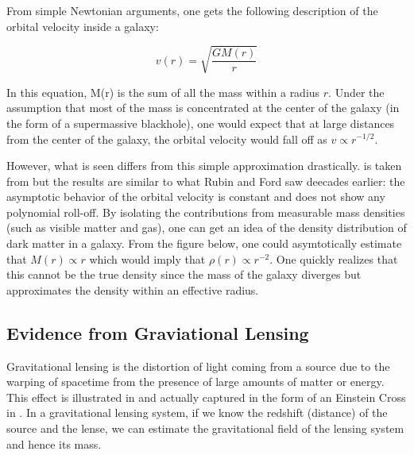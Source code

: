 	From simple Newtonian arguments, one gets the following description of the orbital velocity inside a galaxy:
	
\begin{equation}
v(r) = \sqrt{\frac{G M(r)}{r}}
\end{equation}	

In this equation, M(r) is the sum of all the mass within a radius $r$.  Under the assumption that most of the mass is concentrated at the center of the galaxy (in the form of a supermassive blackhole), one would expect that at large distances from the center of the galaxy, the orbital velocity would fall off as $v \propto r^{-1/2}$.

However, what is seen differs from this simple approximation drastically.   is taken from  but the results are similar to what Rubin and Ford saw deecades earlier: the asymptotic behavior of the orbital velocity is constant and does not show any polynomial roll-off.  By isolating the contributions from measurable mass densities (such as visible matter and gas), one can get an idea of the density distribution of dark matter in a galaxy.  From the figure below, one could asymtotically estimate that $M(r) \propto r$ which would imply that $\rho(r) \propto r^{-2}$.  One quickly realizes that this cannot be the true density since the mass of the galaxy diverges but approximates the density within an effective radius.



\subsection{Evidence from Graviational Lensing}	

Gravitational lensing is the distortion of light coming from a source due to the warping of spacetime from the presence of large amounts of matter or energy.  This effect is illustrated in  and actually captured in the form of an Einstein Cross in .  In a gravitational lensing system, if we know the redshift (distance) of the source and the lense, we can estimate the gravitational field of the lensing system and hence its mass.


